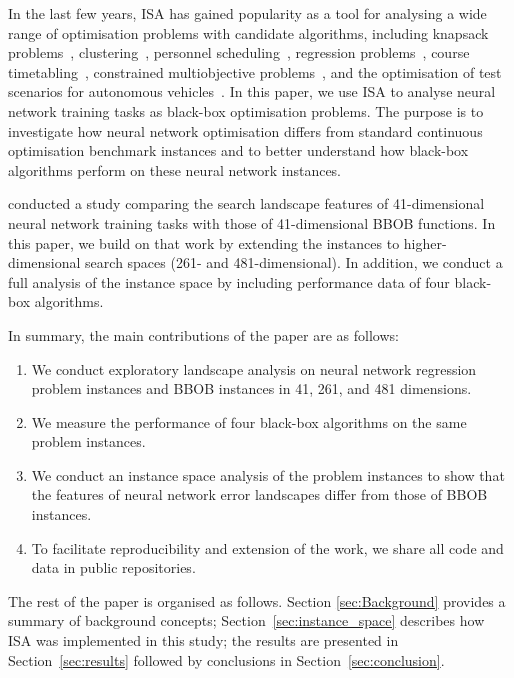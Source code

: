 \documentclass[acmsmall,screen,review,anonymous]{acmart}
\begin{document}
In the last few years, ISA has gained popularity as a tool for analysing a wide range of optimisation problems with candidate algorithms, including knapsack problems~\cite{SmithMiles2021}, clustering~\cite{Fernandes2021}, personnel scheduling~\cite{Kletzander2020}, regression problems~\cite{Munoz2021}, course timetabling~\cite{DeCoster2021}, constrained multiobjective problems~\cite{Alsouly2023}, and the optimisation of test scenarios for autonomous vehicles~\cite{CrespoRodriguez2025}. In this paper, we use ISA to analyse neural network training tasks as black-box optimisation problems. The purpose is to investigate how neural network optimisation differs from standard continuous optimisation benchmark instances and to better understand how black-box algorithms perform on these neural network instances.

\citet{Malan2025} conducted a study comparing the search landscape features of 41-dimensional neural network training tasks with those of 41-dimensional BBOB functions. In this paper, we build on that work by extending the instances to higher-dimensional search spaces (261- and 481-dimensional). In addition, we conduct a full analysis of the instance space by including performance data of four black-box algorithms.

In summary, the main contributions of the paper are as follows:
\begin{enumerate}
    \item We conduct exploratory landscape analysis on neural network regression problem instances and BBOB instances in 41, 261, and 481 dimensions.
    \item We measure the performance of four black-box algorithms on the same problem instances.
    \item We conduct an instance space analysis of the problem instances to show that the features of neural network error landscapes differ from those of BBOB instances.
    \item To facilitate reproducibility and extension of the work, we share all code and data in public repositories.
\end{enumerate}

The rest of the paper is organised as follows. Section \ref{sec:Background} provides a summary of background concepts; Section~\ref{sec:instance_space} describes how ISA was implemented in this study; the results are presented in Section~\ref{sec:results} followed by conclusions in Section~\ref{sec:conclusion}. 
\end{document}
